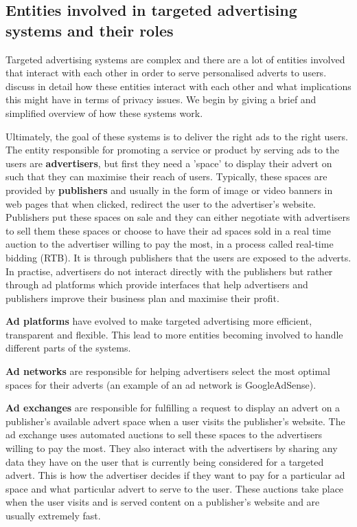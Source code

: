 \documentclass{l4proj}
\begin{document}
\subsection{Entities involved in targeted advertising systems and their roles}
Targeted advertising systems are complex and there are a lot of entities involved that interact with each other in order to serve personalised adverts to users. \cite{Estrada-Jimenez2017} discuss in detail how these entities interact with each other and what implications this might have in terms of privacy issues. We begin by giving a brief and simplified overview of how these systems work. 

Ultimately, the goal of these systems is to deliver the right ads to the right users. The entity responsible for promoting a service or product by serving ads to the users are \textbf{advertisers}, but first they need a 'space' to display their advert  on such that they can maximise their reach of users. Typically, these spaces are provided by \textbf{publishers} and usually in the form of image or video banners in web pages that when clicked, redirect the user to the advertiser's website. Publishers put these spaces on sale and they can either negotiate with advertisers to sell them these spaces or choose to have their ad spaces sold in a real time auction to the advertiser willing to pay the most, in a process called real-time bidding (RTB). It is through publishers that the users are exposed to the adverts. In practise, advertisers do not interact directly with the publishers but rather through ad platforms which provide interfaces that help advertisers and publishers improve their business plan and maximise their profit.

\textbf{Ad platforms} have evolved to make targeted advertising more efficient, transparent and flexible. This lead to more entities becoming involved to handle different parts of the systems. 

\textbf{Ad networks} are responsible for helping advertisers select the most optimal spaces for their adverts (an example of an ad network is GoogleAdSense).

\textbf{Ad exchanges} are responsible for fulfilling a request to display an advert on a publisher's available advert space when a user visits the publisher's website. The ad exchange uses automated auctions to sell these spaces to the advertisers willing to pay the most. They also interact with the advertisers by sharing any data they have on the user that is currently being considered for a targeted advert. This is how the advertiser decides if they want to pay for a particular ad space and what particular advert to serve to the user. These auctions take place when the user visits and is served content on a publisher's website and are usually extremely fast.
\end{document}
